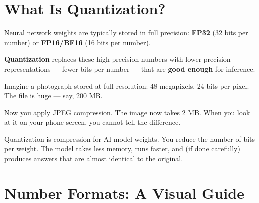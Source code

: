 \documentclass[10pt, oneside, openany]{book}
\newcommand{\analogybox}[2]{\begin{tcolorbox}[analogystyle, title={Analogy: #1}]#2\end{tcolorbox}}
\newcommand{\keyterm}[1]{\textbf{\color{AccentOrange}#1}}
\begin{document}
\section{What Is Quantization?}

Neural network weights are typically stored in full precision:
\textbf{FP32} (32 bits per number) or \textbf{FP16/BF16} (16 bits per number).

\keyterm{Quantization} replaces these high-precision numbers
with lower-precision representations --- fewer bits per number --- that are
\textbf{good enough} for inference.

\analogybox{The Photo Compression Analogy}{
Imagine a photograph stored at full resolution: 48 megapixels, 24 bits per pixel.
The file is huge --- say, 200 MB.

Now you apply JPEG compression.  The image now takes 2 MB.  When you look at it
on your phone screen, you cannot tell the difference.

Quantization is compression for AI model weights.  You reduce the number of bits
per weight.  The model takes less memory, runs faster, and (if done carefully)
produces answers that are almost identical to the original.
}

\section{Number Formats: A Visual Guide}
\end{document}
